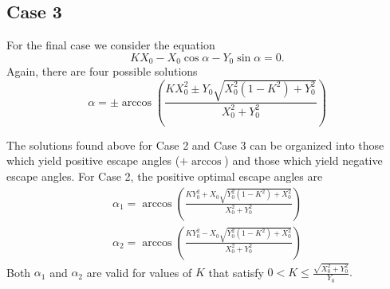 \documentclass[12pt]{article}
\def\ds{\displaystyle}
\begin{document}
\subsection{Case 3}
For the final case we consider the equation 
%
\begin{equation}
K X_0 - X_0 \cos \alpha - Y_0 \sin\alpha = 0.
\end{equation}
%
Again, there are four possible solutions
%
\begin{equation}
\alpha = \pm \arccos \left( \frac{K X_0^2 \pm Y_0 
\ds \sqrt{X_0^2(1-K^2) +Y_0^2}}{X_0^2+Y_0^2} \right )
\end{equation}
%

The solutions found above for Case 2 and Case 3 can be organized into those which yield positive escape angles ($+ \arccos$) and those which yield negative escape angles. For Case 2, the positive optimal escape angles are 
%
\begin{align}
\alpha_{1} =  \arccos \left( \frac{K Y_0^2 +X_0 
\ds\sqrt{Y_0^2(1- K^2) + X_0^2 }}{X_0^2+Y_0^2} \right )
\tag{15a} \label{root_a} \\
\alpha_{2} = \arccos \left(\frac{K Y_0^2 - X_0 
\ds\sqrt{Y_0^2(1- K^2) + X_0^2 }}{X_0^2+Y_0^2} \right )
\tag{15b} \label{root_b}
\end{align}
%
Both $\alpha_1$ and $\alpha_2$ are valid for values of $K$ that satisfy 
$0< K \leq \ds \frac{\sqrt{X_0^2 + Y_0^2}}{Y_0}.$
\end{document}
